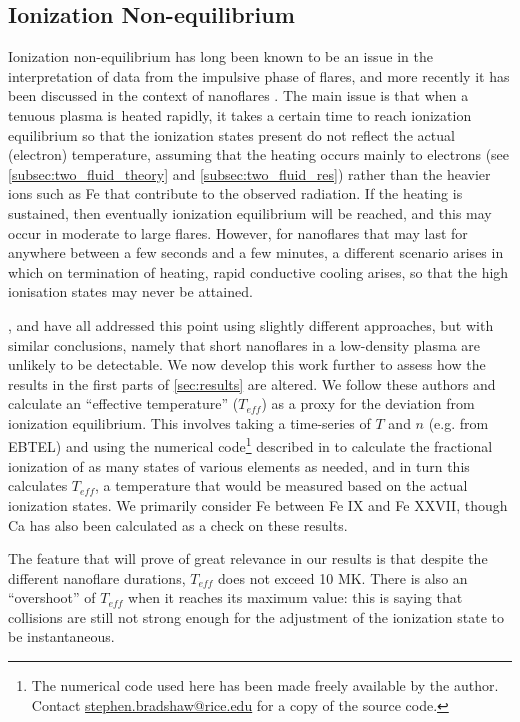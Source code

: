 \documentclass[apj]{emulateapj}
\begin{document}
	\subsection{Ionization Non-equilibrium}
	\label{subsec:nei_theory}
	\par Ionization non-equilibrium has long been known to be an issue in the interpretation of data from the impulsive phase of flares, and more recently it has been discussed in the context of nanoflares \citep{bradshaw_explosive_2006,reale_nonequilibrium_2008}. The main issue is that when a tenuous plasma is heated rapidly, it takes a certain time to reach ionization equilibrium so that the ionization states present do not reflect the actual (electron) temperature, assuming that the heating occurs mainly to electrons (see \autoref{subsec:two_fluid_theory} and \autoref{subsec:two_fluid_res}) rather than the heavier ions such as Fe that contribute to the observed radiation. If the heating is sustained, then eventually ionization equilibrium will be reached, and this may occur in moderate to large flares. However, for nanoflares that may last for anywhere between a few seconds and a few minutes, a different scenario arises in which on termination of heating, rapid conductive cooling arises, so that the high ionisation states may never be attained.
	\par \citet{bradshaw_explosive_2006}, \citet{reale_nonequilibrium_2008} and \citet{bradshaw_numerical_2009} have all addressed this point using slightly different approaches, but with similar conclusions, namely that short nanoflares in a low-density plasma are unlikely to be detectable. We now develop this work further to assess how the results in the first parts of \autoref{sec:results} are altered. We follow these authors and calculate an ``effective temperature'' ($T_{eff}$) as a proxy for the deviation from ionization equilibrium. This involves taking a time-series of $T$ and $n$ (e.g. from EBTEL) and using the numerical code\footnote{The numerical code used here has been made freely available by the author. Contact \href{mailto:stephen.bradshaw@rice.edu}{stephen.bradshaw@rice.edu} for a copy of the source code.} described in \citet{bradshaw_numerical_2009} to calculate the fractional ionization of as many states of various elements as needed, and in turn this calculates $T_{eff}$, a temperature that would be measured based on the actual ionization states. We primarily consider Fe between Fe IX and Fe XXVII, though Ca has also been calculated as a check on these results.
	\par The feature that will prove of great relevance in our results is that despite the different nanoflare durations, $T_{eff}$ does not exceed 10 MK. There is also an ``overshoot'' of $T_{eff}$ when it reaches its maximum value: this is saying that collisions are still not strong enough for the adjustment of the ionization state to be instantaneous.
\end{document}
